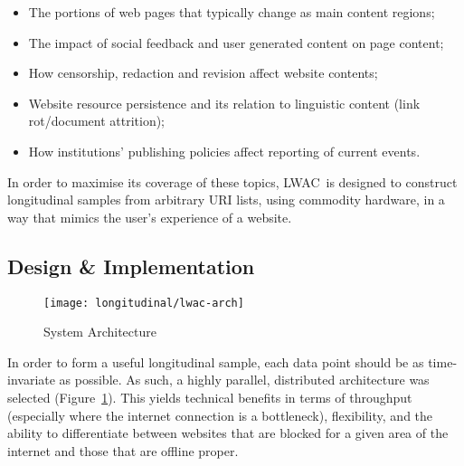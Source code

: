 \begin{itemize}
    \item The portions of web pages that typically change as main content regions;
        \vspace{-6pt}
    \item The impact of social feedback and user generated content on page content;
        \vspace{-6pt}
    \item How censorship, redaction and revision affect website contents;
        \vspace{-6pt}
    \item Website resource persistence and its relation to linguistic content (link rot/document attrition);
        \vspace{-6pt}
    \item How institutions' publishing policies affect reporting of current events.
\end{itemize}

In order to maximise its coverage of these topics, LWAC~is designed to construct longitudinal samples from arbitrary URI lists, using commodity hardware, in a way that mimics the user's experience of a website.  









\subsection{Design \& Implementation}


\begin{figure}[Ht]
    \centering
    \texttt{[image: longitudinal/lwac-arch]}
    \caption{System Architecture}
    \label{fig:longitudinal:lwac:arch}
\end{figure}

In order to form a useful longitudinal sample, each data point should be as time-invariate as possible.  As such, a highly parallel, distributed architecture was selected (Figure~\ref{fig:longitudinal:lwac:arch}).  This yields technical benefits in terms of throughput (especially where the internet connection is a bottleneck), flexibility, and the ability to differentiate between websites that are blocked for a given area of the internet and those that are offline proper.

